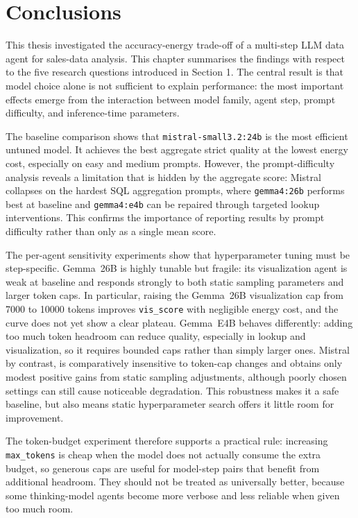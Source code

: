 \section{Conclusions}
\label{sec:conclusions}
\color{black}

This thesis investigated the accuracy-energy trade-off of a multi-step LLM
data agent for sales-data analysis. This chapter summarises the findings with
respect to the five research questions introduced in Section 1. The central 
result is that model choice alone is not sufficient to explain performance: 
the most important effects emerge from the interaction between model family, 
agent step, prompt difficulty, and inference-time parameters.

The baseline comparison shows that \texttt{mistral-small3.2:24b} is the
most efficient untuned model. It achieves the best aggregate strict quality
at the lowest energy cost, especially on easy and medium prompts. However,
the prompt-difficulty analysis reveals a limitation that is hidden by the
aggregate score: Mistral collapses on the hardest SQL aggregation prompts,
where \texttt{gemma4:26b} performs best at baseline and \texttt{gemma4:e4b}
can be repaired through targeted lookup interventions. This confirms the
importance of reporting results by prompt difficulty rather than only as a
single mean score.

The per-agent sensitivity experiments show that hyperparameter tuning must
be step-specific. Gemma~26B is highly tunable but fragile: its visualization
agent is weak at baseline and responds strongly to both static sampling
parameters and larger token caps. In particular, raising the Gemma~26B
visualization cap from 7000 to 10000 tokens improves \texttt{vis\_score}
with negligible energy cost, and the curve does not yet show a clear
plateau. Gemma~E4B behaves differently: adding too much token headroom can
reduce quality, especially in lookup and visualization, so it requires
bounded caps rather than simply larger ones. Mistral by contrast, is comparatively insensitive to token-cap changes and obtains only modest positive gains from static sampling adjustments, although poorly chosen settings can still cause noticeable degradation. This robustness makes it a
safe baseline, but also means static hyperparameter search offers it little
room for improvement.

The token-budget experiment therefore supports a practical rule: increasing
\texttt{max\_tokens} is cheap when the model does not actually consume the
extra budget, so generous caps are useful for model-step pairs that benefit
from additional headroom. They should not be treated as universally better,
because some thinking-model agents become more verbose and less reliable
when given too much room.

